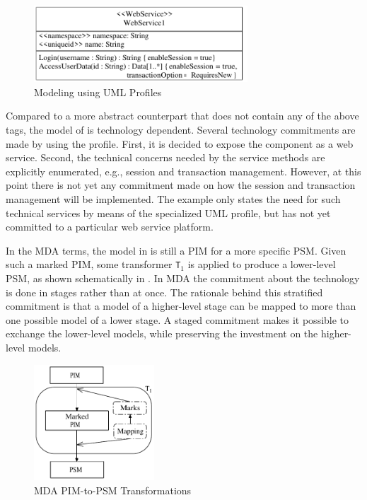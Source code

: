 \begin{figure}[ht]
	\begin{center}
		\includegraphics[width=8cm,height=!]{ch03/uml1}
	\end{center}
	\caption{Modeling using UML Profiles}
	\label{fig.uml1}
\end{figure}

Compared to a more abstract counterpart that does not contain any of the above tags, the model of  is technology dependent. Several technology commitments are made by using the profile. First, it is decided to expose the component as a web service. Second, the technical concerns needed by the service methods are explicitly enumerated, e.g., session and transaction management. However, at this point there is not yet any commitment made on how the session and transaction management will be implemented. The example only states the need for such technical services by means of the specialized UML profile, but has not yet committed to a particular web service platform.

In the MDA terms, the model in  is still a PIM for a more specific PSM. Given such a marked PIM, some transformer \texttt{T$_{1}$} is applied to produce a lower-level PSM, as shown schematically in . In MDA the commitment about the technology is done in stages rather than at once. The rationale behind this stratified commitment \cite{kuhne.01} is that a model of a higher-level stage can be mapped to more than one possible model of a lower stage. A staged commitment makes it possible to exchange the lower-level models, while preserving the investment on the higher-level models.

\begin{figure}[ht]
	\begin{center}
		\includegraphics[width=4.5cm,height=!]{ch03/mda-model-orig}
	\end{center}
	\caption{MDA PIM-to-PSM Transformations}
	\label{fig.mda-model}
\end{figure}

